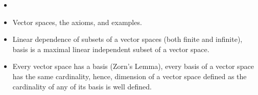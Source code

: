 \begin{recall}
    \begin{itemize}
        \item[]
        \item Vector spaces, the axioms, and examples.
        \item \quad Linear dependence of subsets of a vector spaces (both finite and infinite), basis is a maximal linear independent subset of a vector space.
        \quad\item Every vector space has a basis (Zorn's Lemma), every basis of a vector space has the same cardinality, hence, dimension of a vector space defined as the cardinality of any of its basis is well defined.
    \end{itemize}
\end{recall}

